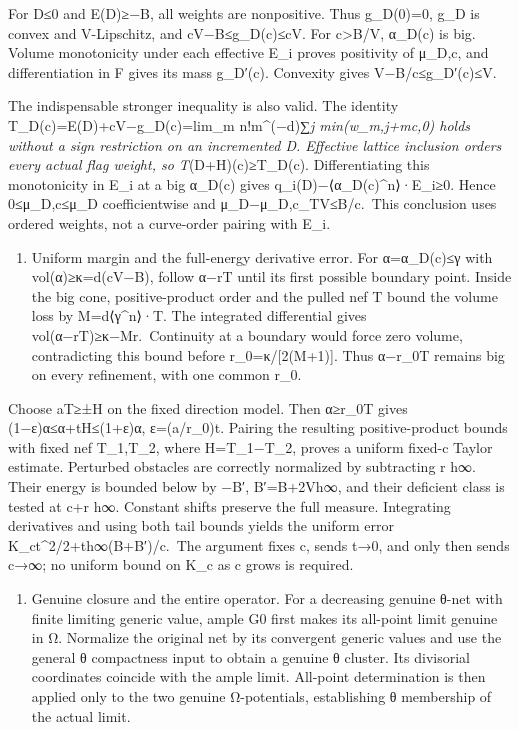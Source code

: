 \documentclass[
  10pt,
]{article}
\providecommand{\tightlist}{%
  \setlength{\itemsep}{0pt}\setlength{\parskip}{0pt}}
\begin{document}
For D≤0 and E(D)≥−B, all weights are nonpositive. Thus g\_D(0)=0, g\_D
is convex and V-Lipschitz, and cV−B≤g\_D(c)≤cV. For c\textgreater B/V,
α\_D(c) is big. Volume monotonicity under each effective E\_i proves
positivity of μ\_D,c, and differentiation in F gives its mass g\_D′(c).
Convexity gives V−B/c≤g\_D′(c)≤V.

The indispensable stronger inequality is also valid. The identity
T\_D(c)=E(D)+cV−g\_D(c)=lim\_m n!m\^{}(−d)∑\emph{j min(w\_m,j+mc,0)
holds without a sign restriction on an incremented D. Effective lattice
inclusion orders every actual flag weight, so T}(D+H)(c)≥T\_D(c).
Differentiating this monotonicity in E\_i at a big α\_D(c) gives
q\_i(D)−⟨α\_D(c)\^{}n⟩·E\_i≥0. Hence 0≤μ\_D,c≤μ\_D coefficientwise and
\textbar\textbar μ\_D−μ\_D,c\textbar\textbar\_TV≤B/c.~This conclusion
uses ordered weights, not a curve-order pairing with E\_i.

\begin{enumerate}
\def\labelenumi{\arabic{enumi}.}
\setcounter{enumi}{7}
\tightlist
\item
  Uniform margin and the full-energy derivative error. For α=α\_D(c)≤γ
  with vol(α)≥κ=d(cV−B), follow α−rT until its first possible boundary
  point. Inside the big cone, positive-product order and the pulled nef
  T bound the volume loss by M=d⟨γ\^{}n⟩·T. The integrated differential
  gives vol(α−rT)≥κ−Mr.~Continuity at a boundary would force zero
  volume, contradicting this bound before r\_0=κ/{[}2(M+1){]}. Thus
  α−r\_0T remains big on every refinement, with one common r\_0.
\end{enumerate}

Choose aT≥±H on the fixed direction model. Then α≥r\_0T gives
(1−ε)α≤α+tH≤(1+ε)α, ε=(a/r\_0)\textbar t\textbar. Pairing the resulting
positive-product bounds with fixed nef T\_1,T\_2, where H=T\_1−T\_2,
proves a uniform fixed-c Taylor estimate. Perturbed obstacles are
correctly normalized by subtracting \textbar r\textbar{}
\textbar\textbar h\textbar\textbar∞. Their energy is bounded below by
−B′, B′=B+2V\textbar\textbar h\textbar\textbar∞, and their deficient
class is tested at c+\textbar r\textbar{}
\textbar\textbar h\textbar\textbar∞. Constant shifts preserve the full
measure. Integrating derivatives and using both tail bounds yields the
uniform error
K\_ct\^{}2/2+\textbar t\textbar\textbar\textbar h\textbar\textbar∞(B+B′)/c.~The
argument fixes c, sends t→0, and only then sends c→∞; no uniform bound
on K\_c as c grows is required.

\begin{enumerate}
\def\labelenumi{\arabic{enumi}.}
\setcounter{enumi}{8}
\tightlist
\item
  Genuine closure and the entire operator. For a decreasing genuine
  θ-net with finite limiting generic value, ample G0 first makes its
  all-point limit genuine in Ω. Normalize the original net by its
  convergent generic values and use the general θ compactness input to
  obtain a genuine θ cluster. Its divisorial coordinates coincide with
  the ample limit. All-point determination is then applied only to the
  two genuine Ω-potentials, establishing θ membership of the actual
  limit.
\end{enumerate}
\end{document}
